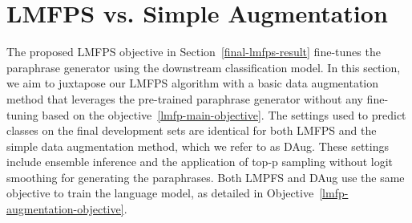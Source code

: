 \documentclass[11pt]{article}
\begin{document}
\section{LMFPS vs. Simple Augmentation}
\label{lmfps-simple-augmentation:appendix}
The proposed LMFPS objective in Section~\ref{final-lmfps-result} fine-tunes the paraphrase generator using the downstream classification model. In this section, we aim to juxtapose our LMFPS algorithm with a basic data augmentation method that leverages the pre-trained paraphrase generator without any fine-tuning based on the objective~\ref{lmfp-main-objective}. The settings used to predict classes on the final development sets are identical for both LMFPS and the simple data augmentation method, which we refer to as DAug. These settings include ensemble inference and the application of top-p sampling without logit smoothing for generating the paraphrases. Both LMPFS and DAug use the same objective to train the language model, as detailed in Objective~\ref{lmfp-augmentation-objective}.
\end{document}
